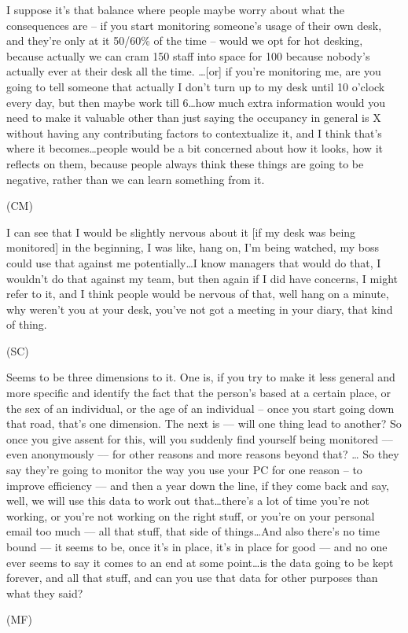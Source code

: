 \begin{qt}I suppose it’s that balance where people maybe worry about what the
consequences are – if you start monitoring someone’s usage of their
own desk, and they’re only at it 50/60\% of the time – would we opt
for hot desking, because actually we can cram 150 staff into space for
100 because nobody’s actually ever at their desk all the time. \ldots  [or]
if you’re monitoring me, are you going to tell someone that actually I
don’t turn up to my desk until 10 o’clock every day, but then maybe
work till 6\ldots how much extra information would you need to make it
valuable other than just saying the occupancy in general is X without
having any contributing factors to contextualize it, and I think
that’s where it becomes\ldots people would be a bit concerned about how it
looks, how it reflects on them, because people always think these
things are going to be negative, rather than we can learn something
from it.
\end{qt}
(CM) 

\begin{qt}I can see that I would be slightly nervous about it [if my desk was
being monitored] in the beginning, I was like, hang on, I’m being
watched, my boss could use that against me potentially\ldots I know managers
that would do that, I wouldn’t do that against my team, but then again
if I did have concerns, I might refer to it, and I think people would
be nervous of that, well hang on a minute, why weren’t you at your
desk, you’ve not got a meeting in your diary, that kind of thing.
\end{qt}
(SC)

\begin{qt}Seems to be three dimensions to it. One is, if you try to make it
less general and more specific and identify the fact that the person’s
based at a certain place, or the sex of an individual, or the age of
an individual – once you start going down that road, that’s one
dimension. The next is --– will one thing lead to another? So once you
give assent for this, will you suddenly find yourself being monitored
--– even anonymously --– for other reasons and more reasons beyond that? \ldots 
So they say they’re going to monitor the way you use your PC for one
reason – to improve efficiency –-- and then a year down the line, if
they come back and say, well, we will use this data to work out
that\ldots there’s a lot of time you’re not working, or you’re not working
on the right stuff, or you’re on your personal email too much --- all
that stuff, that side of things\ldots And also there’s no time bound --– it
seems to be, once it’s in place, it’s in place for good –-- and no one
ever seems to say it comes to an end at some point\ldots is the data going
to be kept forever, and all that stuff, and can you use that data for
other purposes than what they said?
\end{qt}
(MF)

